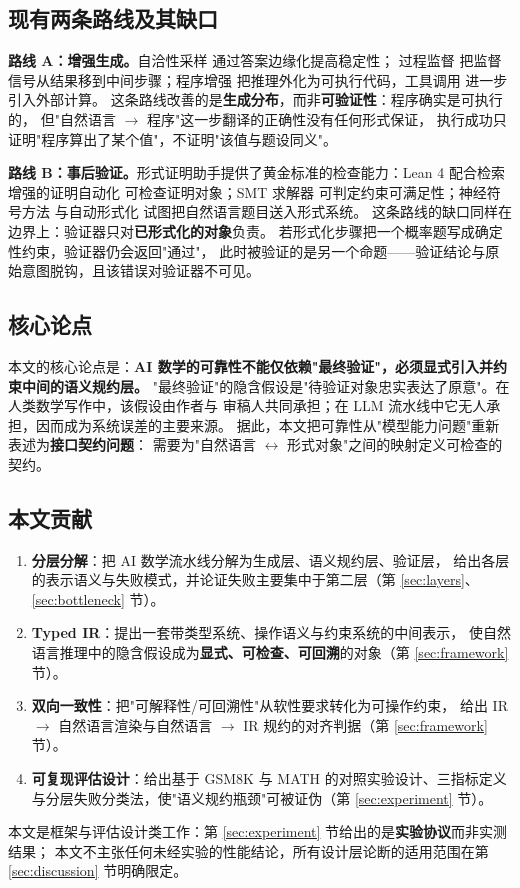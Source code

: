 \documentclass[11pt]{article}
\begin{document}
\subsection{现有两条路线及其缺口}
\textbf{路线 A：增强生成。}自洽性采样\cite{wang2022selfconsistency} 通过答案边缘化提高稳定性；
过程监督\cite{lightman2023verify} 把监督信号从结果移到中间步骤；程序增强\cite{chen2022programofthoughts,gao2022pal}
把推理外化为可执行代码，工具调用\cite{schick2023toolformer} 进一步引入外部计算。
这条路线改善的是\textbf{生成分布}，而非\textbf{可验证性}：程序确实是可执行的，
但"自然语言 $\to$ 程序"这一步翻译的正确性没有任何形式保证，
执行成功只证明"程序算出了某个值"，不证明"该值与题设同义"。

\textbf{路线 B：事后验证。}形式证明助手提供了黄金标准的检查能力：Lean 4\cite{demoura2021lean4}
配合检索增强的证明自动化\cite{yang2023leandojo} 可检查证明对象；SMT 求解器\cite{demoura2008z3}
可判定约束可满足性；神经符号方法\cite{pan2023logiclm,marra2024neurosymbolic} 与自动形式化
\cite{wu2022autoformalization} 试图把自然语言题目送入形式系统。
这条路线的缺口同样在边界上：验证器只对\textbf{已形式化的对象}负责。
若形式化步骤把一个概率题写成确定性约束，验证器仍会返回"通过"，
此时被验证的是另一个命题——验证结论与原始意图脱钩，且该错误对验证器不可见。

\subsection{核心论点}
本文的核心论点是：\textbf{AI 数学的可靠性不能仅依赖"最终验证"，必须显式引入并约束中间的语义规约层。}
"最终验证"的隐含假设是"待验证对象忠实表达了原意"。在人类数学写作中，该假设由作者与
审稿人共同承担；在 LLM 流水线中它无人承担，因而成为系统误差的主要来源。
据此，本文把可靠性从"模型能力问题"重新表述为\textbf{接口契约问题}：
需要为"自然语言 $\leftrightarrow$ 形式对象"之间的映射定义可检查的契约。

\subsection{本文贡献}
\begin{enumerate}[leftmargin=1.6em,itemsep=2pt]
\item \textbf{分层分解}：把 AI 数学流水线分解为生成层、语义规约层、验证层，
给出各层的表示语义与失败模式，并论证失败主要集中于第二层（第 \ref{sec:layers}、\ref{sec:bottleneck} 节）。
\item \textbf{Typed IR}：提出一套带类型系统、操作语义与约束系统的中间表示，
使自然语言推理中的隐含假设成为\textbf{显式、可检查、可回溯}的对象（第 \ref{sec:framework} 节）。
\item \textbf{双向一致性}：把"可解释性/可回溯性"从软性要求转化为可操作约束，
给出 IR $\to$ 自然语言渲染与自然语言 $\to$ IR 规约的对齐判据（第 \ref{sec:framework} 节）。
\item \textbf{可复现评估设计}：给出基于 GSM8K\cite{cobbe2021gsm8k} 与 MATH\cite{hendrycks2021math}
的对照实验设计、三指标定义与分层失败分类法，使"语义规约瓶颈"可被证伪（第 \ref{sec:experiment} 节）。
\end{enumerate}
本文是框架与评估设计类工作：第 \ref{sec:experiment} 节给出的是\textbf{实验协议}而非实测结果；
本文不主张任何未经实验的性能结论，所有设计层论断的适用范围在第 \ref{sec:discussion} 节明确限定。
\end{document}
